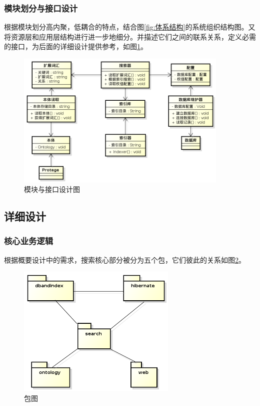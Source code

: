 \documentclass[12pt,a4paper]{article}
\newcommand{\wuhao}{\fontsize{10.5pt}{\baselineskip}\selectfont}
\begin{document}
		\subsubsection{模块划分与接口设计}
	根据模块划分高内聚，低耦合的特点，结合图\ref{fig:体系结构}的系统组织结构图。又将资源层和应用层结构进行进一步地细分。并描述它们之间的联系关系，定义必需的接口，为后面的详细设计提供参考，如图\ref{fig:模块与接口设计图}。
	
	\begin{figure}[htbp] 
	\centering\includegraphics[width=4in]{fig/moduleInterface.png} 
	\caption{\wuhao 模块与接口设计图}\label{fig:模块与接口设计图}
	\end{figure}
	
	\subsection{详细设计}	
	\subsubsection{核心业务逻辑}
	根据概要设计中的需求，搜索核心部分被分为五个包，它们彼此的关系如图\ref{fig:包图}。
	\begin{figure}[htbp] 
	\centering\includegraphics[width=3in]{fig/Package.png} 
	\caption{\wuhao 包图}\label{fig:包图}
	\end{figure}
	
\end{document}
